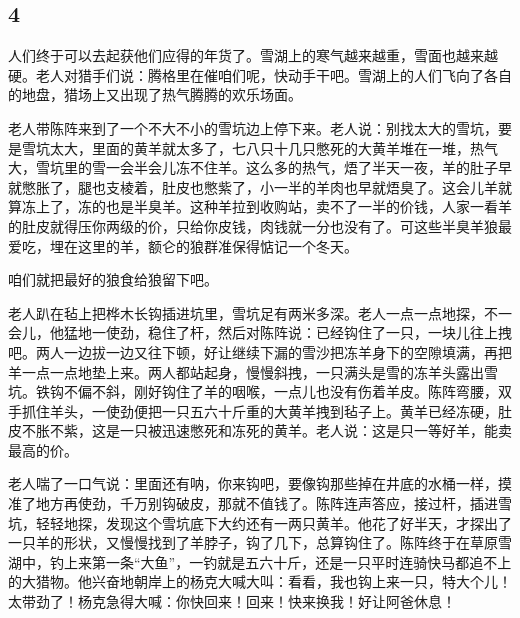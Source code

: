 \subsection*{4}

\par 人们终于可以去起获他们应得的年货了。雪湖上的寒气越来越重，雪面也越来越硬。老人对猎手们说：腾格里在催咱们呢，快动手干吧。雪湖上的人们飞向了各自的地盘，猎场上又出现了热气腾腾的欢乐场面。
\par 老人带陈阵来到了一个不大不小的雪坑边上停下来。老人说：别找太大的雪坑，要是雪坑太大，里面的黄羊就太多了，七八只十几只憋死的大黄羊堆在一堆，热气大，雪坑里的雪一会半会儿冻不住羊。这么多的热气，焐了半天一夜，羊的肚子早就憋胀了，腿也支棱着，肚皮也憋紫了，小一半的羊肉也早就焐臭了。这会儿羊就算冻上了，冻的也是半臭羊。这种羊拉到收购站，卖不了一半的价钱，人家一看羊的肚皮就得压你两级的价，只给你皮钱，肉钱就一分也没有了。可这些半臭羊狼最爱吃，埋在这里的羊，额仑的狼群准保得惦记一个冬天。
\par 咱们就把最好的狼食给狼留下吧。
\par 老人趴在毡上把桦木长钩插进坑里，雪坑足有两米多深。老人一点一点地探，不一会儿，他猛地一使劲，稳住了杆，然后对陈阵说：已经钩住了一只，一块儿往上拽吧。两人一边拔一边又往下顿，好让继续下漏的雪沙把冻羊身下的空隙填满，再把羊一点一点地垫上来。两人都站起身，慢慢斜拽，一只满头是雪的冻羊头露出雪坑。铁钩不偏不斜，刚好钩住了羊的咽喉，一点儿也没有伤着羊皮。陈阵弯腰，双手抓住羊头，一使劲便把一只五六十斤重的大黄羊拽到毡子上。黄羊已经冻硬，肚皮不胀不紫，这是一只被迅速憋死和冻死的黄羊。老人说：这是只一等好羊，能卖最高的价。
\par 老人喘了一口气说：里面还有呐，你来钩吧，要像钩那些掉在井底的水桶一样，摸准了地方再使劲，千万别钩破皮，那就不值钱了。陈阵连声答应，接过杆，插进雪坑，轻轻地探，发现这个雪坑底下大约还有一两只黄羊。他花了好半天，才探出了一只羊的形状，又慢慢找到了羊脖子，钩了几下，总算钩住了。陈阵终于在草原雪湖中，钓上来第一条“大鱼”，一钓就是五六十斤，还是一只平时连骑快马都追不上的大猎物。他兴奋地朝岸上的杨克大喊大叫：看看，我也钩上来一只，特大个儿！太带劲了！杨克急得大喊：你快回来！回来！快来换我！好让阿爸休息！
